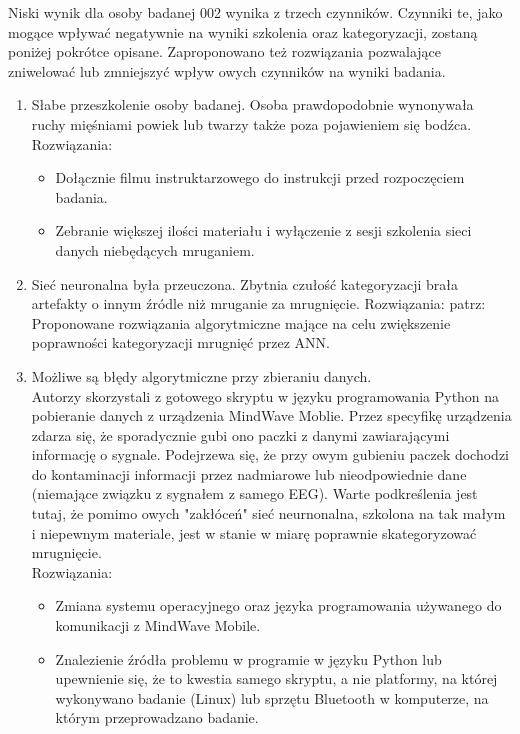 \documentclass{article}
\begin{document}
        Niski wynik dla osoby badanej 002 wynika z trzech czynników. Czynniki te, jako mogące wpływać negatywnie na wyniki szkolenia oraz kategoryzacji, zostaną poniżej pokrótce opisane. Zaproponowano też rozwiązania pozwalające zniwelować lub zmniejszyć wpływ owych czynników na wyniki badania.
            \begin{enumerate}
                \item Słabe przeszkolenie osoby badanej. Osoba prawdopodobnie wynonywała ruchy mięśniami powiek lub twarzy także poza pojawieniem się bodźca. \\
                    Rozwiązania: 
                    \begin{itemize}
                        \item Dołącznie filmu instruktarzowego do instrukcji przed rozpoczęciem badania. 
                        \item Zebranie większej ilości materiału i wyłączenie z sesji szkolenia sieci danych niebędących mruganiem. 
                    \end{itemize}
                \item Sieć neuronalna była przeuczona. Zbytnia czułość kategoryzacji brała artefakty o innym źródle niż mruganie za mrugnięcie.
                    Rozwiązania: patrz: Proponowane rozwiązania algorytmiczne mające na celu zwiększenie poprawności kategoryzacji mrugnięć przez ANN.
                \item Możliwe są błędy algorytmiczne przy zbieraniu danych.\\
                    Autorzy skorzystali z gotowego skryptu w języku programowania Python na pobieranie danych z urządzenia MindWave Moblie. Przez specyfikę urządzenia zdarza się, że sporadycznie gubi ono paczki z danymi zawiarającymi informację o sygnale. Podejrzewa się, że przy owym gubieniu paczek dochodzi do kontaminacji informacji przez nadmiarowe lub nieodpowiednie dane (niemające związku z sygnałem z samego EEG). Warte podkreślenia jest tutaj, że pomimo owych "zakłóceń" sieć neurnonalna, szkolona na tak małym i niepewnym materiale, jest w stanie w miarę poprawnie skategoryzować mrugnięcie. \\
                    Rozwiązania: 
                    \begin{itemize}
                        \item Zmiana systemu operacyjnego oraz języka programowania używanego do komunikacji z MindWave Mobile. 
                        \item Znalezienie źródła problemu w programie w języku Python lub upewnienie się, że to kwestia samego skryptu, a nie platformy, na której wykonywano badanie (Linux) lub sprzętu Bluetooth w komputerze, na którym przeprowadzano badanie.
                    \end{itemize}
            \end{enumerate}
\end{document}
